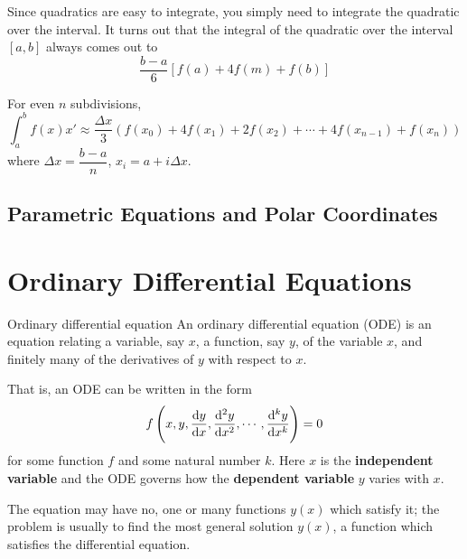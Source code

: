 Since quadratics are easy to integrate, you simply need to integrate the quadratic over the interval. It turns out that the integral of the quadratic over the interval $[a,b]$ always comes out to 
\begin{equation}
\frac{b-a}{6}[f(a)+4f(m)+f(b)]
\end{equation}

For even $n$ subdivisions,
\begin{equation}
\int_a^bf(x)x' \approx \frac {\Delta x}{3} (f(x_0) + 4f(x_1) + 2f(x_2) + \cdots + 4f(x_{n-1} )+ f(x_n))
\end{equation}
where $\Delta x = \dfrac{b-a}{n}$, $x_i =a+ i\Delta x$.

\subsection{Parametric Equations and Polar Coordinates}

\pagebreak

\section{Ordinary Differential Equations}

\begin{defn}{Ordinary differential equation}{} 
An ordinary differential equation (ODE) is an equation relating a variable, say $x$, a function, say $y$, of the variable $x$, and finitely many of the derivatives of $y$ with respect to $x$.

That is, an ODE can be written in the form
\[ f\left(x,y,\dv{y}{x},\dv[2]{y}{x},\cdots,\dv[k]{y}{x}\right) = 0 \]
for some function $f$ and some natural number $k$. Here $x$ is the \textbf{independent variable} and the ODE governs how the \textbf{dependent variable} $y$ varies with $x$. 
\end{defn}

\begin{remark}
The equation may have no, one or many functions $y(x)$ which satisfy it; the problem is usually to find the most general solution $y(x)$, a function which satisfies the differential equation.
\end{remark}

